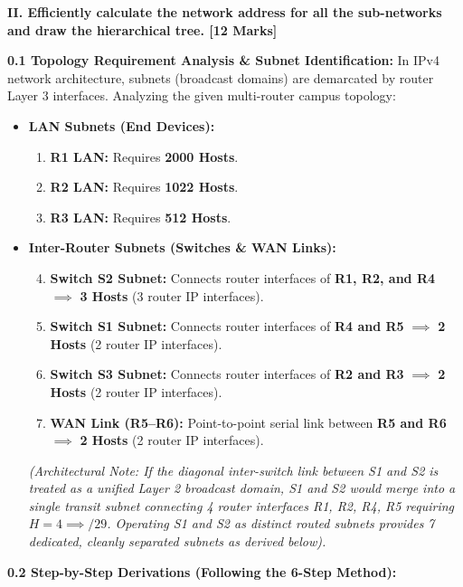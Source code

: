 \documentclass[11pt,a4paper]{article}
\begin{document}
\vspace{0.2cm}
\textbf{II. Efficiently calculate the network address for all the sub-networks and draw the hierarchical tree. [12 Marks]}

\textbf{0.1 Topology Requirement Analysis \& Subnet Identification:}
In IPv4 network architecture, subnets (broadcast domains) are demarcated by router Layer 3 interfaces. Analyzing the given multi-router campus topology:
\begin{itemize}
    \item \textbf{LAN Subnets (End Devices):}
    \begin{enumerate}
        \item \textbf{R1 LAN:} Requires \textbf{2000 Hosts}.
        \item \textbf{R2 LAN:} Requires \textbf{1022 Hosts}.
        \item \textbf{R3 LAN:} Requires \textbf{512 Hosts}.
    \end{enumerate}
    \item \textbf{Inter-Router Subnets (Switches \& WAN Links):}
    \begin{enumerate}
        \setcounter{enumi}{3}
        \item \textbf{Switch S2 Subnet:} Connects router interfaces of \textbf{R1, R2, and R4} $\implies$ \textbf{3 Hosts} (3 router IP interfaces).
        \item \textbf{Switch S1 Subnet:} Connects router interfaces of \textbf{R4 and R5} $\implies$ \textbf{2 Hosts} (2 router IP interfaces).
        \item \textbf{Switch S3 Subnet:} Connects router interfaces of \textbf{R2 and R3} $\implies$ \textbf{2 Hosts} (2 router IP interfaces).
        \item \textbf{WAN Link (R5--R6):} Point-to-point serial link between \textbf{R5 and R6} $\implies$ \textbf{2 Hosts} (2 router IP interfaces).
    \end{enumerate}
    \textit{(Architectural Note: If the diagonal inter-switch link between S1 and S2 is treated as a unified Layer 2 broadcast domain, S1 and S2 would merge into a single transit subnet connecting 4 router interfaces R1, R2, R4, R5 requiring $H=4 \implies /29$. Operating S1 and S2 as distinct routed subnets provides 7 dedicated, cleanly separated subnets as derived below).}
\end{itemize}

\vspace{0.2cm}
\textbf{0.2 Step-by-Step Derivations (Following the 6-Step Method):}
\end{document}
